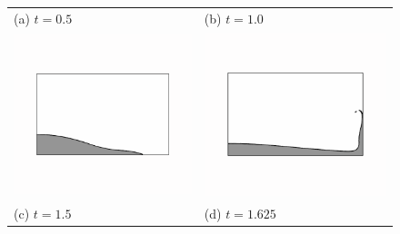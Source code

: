 \begin{figure}[tbp]
\begin{center}
\begin{tabular}{ll}
(a) $t = 0.5$ & (b) $t = 1.0$   \\
\includegraphics[width=7cm, trim=2.5cm 4.5cm 2.5cm 4.5cm, clip=true]{examples_images/water_collapse/water_collapse_100.png} & \includegraphics[width=7cm, trim=2.5cm 4.5cm 2.5cm 4.5cm, clip=true]{examples_images/water_collapse/water_collapse_200.png} \\
(c) $t = 1.5$ & (d) $t = 1.625$ \\

\end{tabular}
\end{center}
\end{figure}

